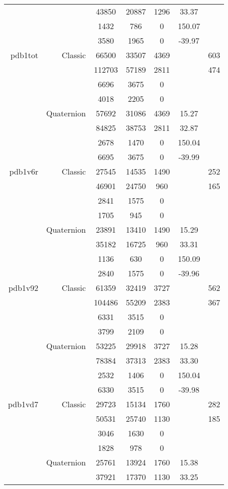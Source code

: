 \begin{xltabular}{\textwidth}{r|rcccSc}
& & 43850 & 20887 & 1296 & 33.37 & \\
& & 1432 & 786 & 0 & 150.07 & \\
& & 3580 & 1965 & 0 & -39.97 & \\ \addlinespace
pdb1tot & Classic & 66500 & 33507 & 4369 & & 603 \\
& & 112703 & 57189 & 2811 & & 474 \\
& & 6696 & 3675 & 0 & & \\
& & 4018 & 2205 & 0 & & \\
& Quaternion & 57692 & 31086 & 4369 & 15.27 & \\
& & 84825 & 38753 & 2811 & 32.87 & \\
& & 2678 & 1470 & 0 & 150.04 & \\
& & 6695 & 3675 & 0 & -39.99 & \\ \addlinespace
pdb1v6r & Classic & 27545 & 14535 & 1490 & & 252 \\
& & 46901 & 24750 & 960 & & 165 \\
& & 2841 & 1575 & 0 & & \\
& & 1705 & 945 & 0 & & \\
& Quaternion & 23891 & 13410 & 1490 & 15.29 & \\
& & 35182 & 16725 & 960 & 33.31 & \\
& & 1136 & 630 & 0 & 150.09 & \\
& & 2840 & 1575 & 0 & -39.96 & \\ \addlinespace
pdb1v92 & Classic & 61359 & 32419 & 3727 & & 562 \\
& & 104486 & 55209 & 2383 & & 367 \\
& & 6331 & 3515 & 0 & & \\
& & 3799 & 2109 & 0 & & \\
& Quaternion & 53225 & 29918 & 3727 & 15.28 & \\
& & 78384 & 37313 & 2383 & 33.30 & \\
& & 2532 & 1406 & 0 & 150.04 & \\
& & 6330 & 3515 & 0 & -39.98 & \\ \addlinespace
pdb1vd7 & Classic & 29723 & 15134 & 1760 & & 282 \\
& & 50531 & 25740 & 1130 & & 185 \\
& & 3046 & 1630 & 0 & & \\
& & 1828 & 978 & 0 & & \\
& Quaternion & 25761 & 13924 & 1760 & 15.38 & \\
& & 37921 & 17370 & 1130 & 33.25 & \\

\end{xltabular}
